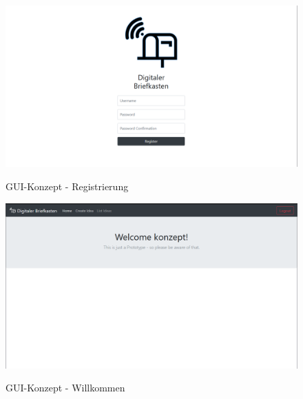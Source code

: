 \begin{figure}[h]
    \centering
    \begin{minipage}[t]{1\textwidth}
        \caption{GUI-Konzept - Registrierung }
        \includegraphics[width=1\textwidth]{img/registrierung-konzept.png}\\
    \end{minipage}
\end{figure}

\begin{figure}[h]
    \centering
    \begin{minipage}[t]{1\textwidth}
        \caption{GUI-Konzept - Willkommen}
        \includegraphics[width=1\textwidth]{img/welcome-konzept.png}\\
    \end{minipage}
\end{figure}

